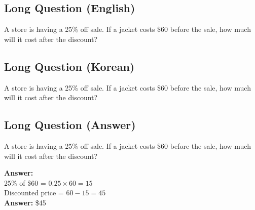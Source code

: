 \cleardoublepage
\subsection*{Long Question (English)}
A store is having a 25\% off sale. If a jacket costs \$60 before the sale, how much will it cost after the discount?


\newpage
\subsection*{Long Question (Korean)}
A store is having a 25\% off sale. If a jacket costs \$60 before the sale, how much will it cost after the discount?


\newpage
\subsection*{Long Question (Answer)}
A store is having a 25\% off sale. If a jacket costs \$60 before the sale, how much will it cost after the discount?

\textbf{Answer:}\\
25\% of \$60 = $0.25 \times 60 = 15$\\
Discounted price = $60 - 15 = 45$\\
\textbf{Answer:} \$45
